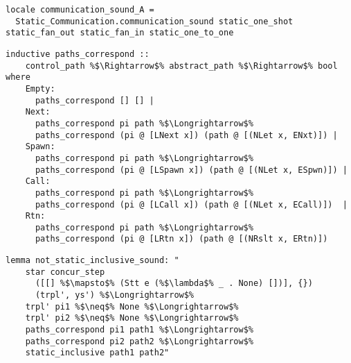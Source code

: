 \documentclass{article}
\begin{document}
\begin{lstlisting}[style=codestyle1, escapechar=\%]
locale communication_sound_A = 
  Static_Communication.communication_sound static_one_shot static_fan_out static_fan_in static_one_to_one
    \end{lstlisting}

\begin{lstlisting}[style=codestyle1, escapechar=\%]
  inductive paths_correspond ::
    control_path %$\Rightarrow$% abstract_path %$\Rightarrow$% bool where
    Empty:
      paths_correspond [] [] |
    Next:
      paths_correspond pi path %$\Longrightarrow$%
      paths_correspond (pi @ [LNext x]) (path @ [(NLet x, ENxt)]) |
    Spawn:
      paths_correspond pi path %$\Longrightarrow$%
      paths_correspond (pi @ [LSpawn x]) (path @ [(NLet x, ESpwn)]) |
    Call:
      paths_correspond pi path %$\Longrightarrow$%
      paths_correspond (pi @ [LCall x]) (path @ [(NLet x, ECall)])  |
    Rtn:
      paths_correspond pi path %$\Longrightarrow$%
      paths_correspond (pi @ [LRtn x]) (path @ [(NRslt x, ERtn)]) 
  \end{lstlisting}

\begin{lstlisting}[style=codestyle1, escapechar=\%]
  lemma not_static_inclusive_sound: "
    star concur_step
      ([[] %$\mapsto$% (Stt e (%$\lambda$% _ . None) [])], {})
      (trpl', ys') %$\Longrightarrow$% 
    trpl' pi1 %$\neq$% None %$\Longrightarrow$% 
    trpl' pi2 %$\neq$% None %$\Longrightarrow$% 
    paths_correspond pi1 path1 %$\Longrightarrow$%
    paths_correspond pi2 path2 %$\Longrightarrow$%
    static_inclusive path1 path2"

  \end{lstlisting}
\end{document}
